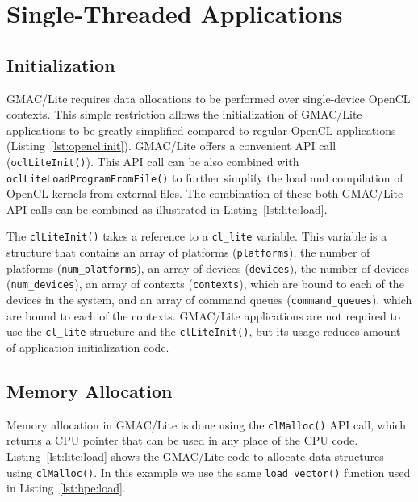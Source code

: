 \section{Single\hyp{}Threaded Applications}

\subsection{Initialization}
GMAC\slash Lite requires data allocations to be performed over single\hyp{}device OpenCL contexts.  
This simple restriction allows the initialization of GMAC\slash Lite applications to be greatly 
simplified compared to regular OpenCL applications (Listing~\ref{lst:opencl:init}). GMAC\slash Lite 
offers a convenient API call (\texttt{oclLiteInit()}). This API call can be also combined with 
\texttt{oclLiteLoadProgramFromFile()} to further simplify the load and compilation of OpenCL kernels 
from external files. The combination of these both GMAC\slash Lite API calls can be combined as 
illustrated in Listing~\ref{lst:lite:load}.



The \texttt{clLiteInit()} takes a reference to a \texttt{cl\_lite} variable. This variable is a 
structure that contains an array of platforms (\texttt{platforms}), the number of platforms 
(\texttt{num\_platforms}), an array of devices (\texttt{devices}), the number of devices 
(\texttt{num\_devices}), an array of contexts (\texttt{contexts}), which are bound to each of the 
devices in the system, and an array of command queues (\texttt{command\_queues}), which are bound to 
each of the contexts. GMAC\slash Lite applications are not required to use the \texttt{cl\_lite} 
structure and the \texttt{clLiteInit()}, but its usage reduces amount of application initialization 
code.

\subsection{Memory Allocation}
Memory allocation in GMAC\slash Lite is done using the \texttt{clMalloc()} API call, which returns a 
CPU pointer that can be used in any place of the CPU code. Listing~\ref{lst:lite:load} shows the 
GMAC\slash Lite code to allocate data structures using \texttt{clMalloc()}. In this example we use 
the same \texttt{load\_vector()} function used in Listing~\ref{lst:hpe:load}.

